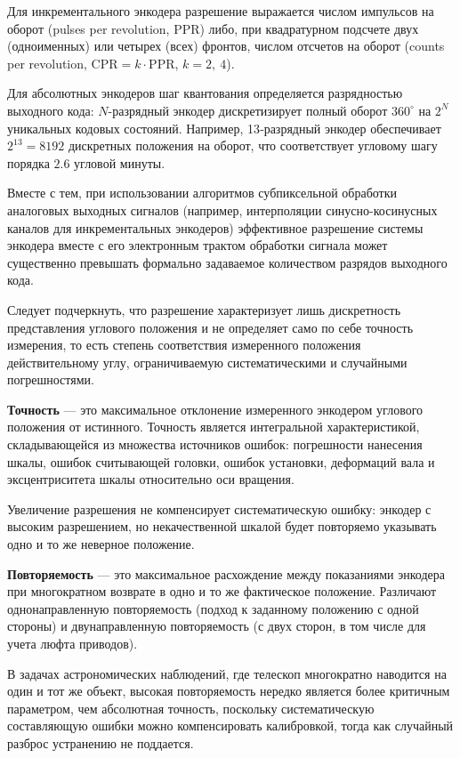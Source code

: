 Для инкрементального энкодера разрешение выражается числом импульсов на оборот (pulses per revolution, PPR) либо, при квадратурном подсчете двух (одноименных) или четырех (всех) фронтов, числом отсчетов на оборот (counts per revolution, $\mathrm{CPR} = k\cdot\mathrm{PPR}$, $k = 2,~4$).

Для абсолютных энкодеров шаг квантования определяется разрядностью выходного кода: $N$-разрядный энкодер дискретизирует полный оборот $360^\circ$ на $2^N$ уникальных кодовых состояний. Например, 13‑разрядный энкодер обеспечивает $2^{13} = 8192$ дискретных положения на оборот, что соответствует угловому шагу порядка $2.6$ угловой минуты. 

Вместе с тем, при использовании алгоритмов субпиксельной обработки аналоговых выходных сигналов (например, интерполяции синусно-косинусных каналов для инкрементальных энкодеров) эффективное разрешение системы энкодера вместе с его электронным трактом обработки сигнала может существенно превышать формально задаваемое количеством разрядов выходного кода.

Следует подчеркнуть, что разрешение характеризует лишь дискретность представления углового положения и не определяет само по себе точность измерения, то есть степень соответствия измеренного положения действительному углу, ограничиваемую систематическими и случайными погрешностями.

\textbf{Точность} --- это максимальное отклонение измеренного энкодером углового положения от истинного. Точность является интегральной характеристикой, складывающейся из множества источников ошибок: погрешности нанесения шкалы, ошибок считывающей головки, ошибок установки, деформаций вала и эксцентриситета шкалы относительно оси вращения.

Увеличение разрешения не компенсирует систематическую ошибку: энкодер с высоким разрешением, но некачественной шкалой будет повторяемо указывать одно и то же неверное положение.

\textbf{Повторяемость} --- это максимальное расхождение между показаниями энкодера при многократном возврате в одно и то же фактическое положение. Различают однонаправленную повторяемость (подход к заданному положению с одной стороны) и двунаправленную повторяемость (с двух сторон, в том числе для учета люфта приводов).

В задачах астрономических наблюдений, где телескоп многократно наводится на один и тот же объект, высокая повторяемость нередко является более критичным параметром, чем абсолютная точность, поскольку систематическую составляющую ошибки можно компенсировать калибровкой, тогда как случайный разброс устранению не поддается.

